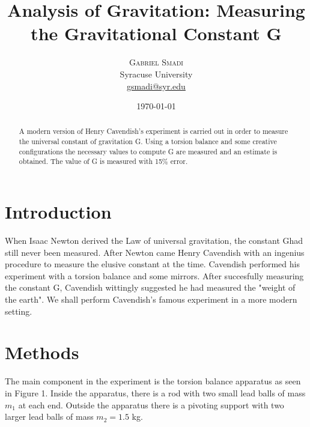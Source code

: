 \documentclass[twoside,twocolumn]{article}
\title{Analysis of Gravitation: Measuring the Gravitational Constant G} %
\author{
\textsc{Gabriel Smadi} \\ %
\normalsize{Syracuse University} \\ %
\normalsize \href{mailto:gsmadi@syr.edu}{gsmadi@syr.edu} %
}
\date{\today} %
\begin{document}
\maketitle

\begin{abstract}
  A modern version of Henry Cavendish's experiment is carried out in order to measure the universal
  constant of gravitation G. Using a torsion balance and some creative configurations the necessary
  values to compute G are measured and an estimate is obtained. The value of G is measured with 15$\%$ error.
\end{abstract}


\section{Introduction}

When Isaac Newton derived the Law of universal gravitation, the constant Ghad still never been
measured. After Newton came Henry Cavendish with an ingenius procedure to measure the elusive constant
at the time. Cavendish performed his experiment with a torsion balance and some mirrors. After succesfully
measuring the constant G, Cavendish wittingly suggested he had measured the "weight of the earth". We shall
perform Cavendish's famous experiment in a more modern setting.


\section{Methods}

The main component in the experiment is the torsion balance apparatus as seen in Figure 1. Inside the
apparatus, there is a rod with two small lead balls of mass $m_{1}$ at each end. Outside the apparatus there is
a pivoting support with two larger lead balls of mass $m_{2} = 1.5$ kg.
\end{document}
